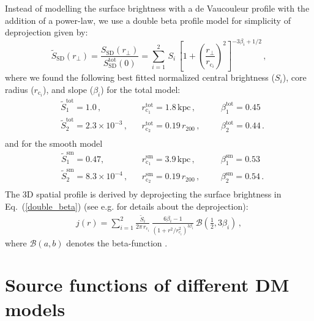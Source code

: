 \documentclass[10pt,aps,pra,reprint,amsmath,amsfonts,amssymb,showpacs,nofootinbib,floatfix]{revtex4-1}
\newcommand{\rmn}{\mathrm}
\newcommand{\sd}{\rmn{SD}}
\newcommand{\rvir}{r_{200}}
\begin{document}
Instead of modelling the surface brightness with a de Vaucouleur
profile with the addition of a power-law, we use a double beta profile
model for simplicity of deprojection given by:
\begin{equation}
\tilde{S}_\sd (r_\bot) = \frac{S_\sd (r_\bot)}{S_\rmn{SD}^\rmn{tot}(0)} = 
\sum_{i=1}^2 \,S_i\, 
\left[1 + \left( \frac{r_\bot}{r_{\mathrm{c}_i}}\right)^2\right]
^{-3\beta_i + 1/2}\,,
\label{double_beta}
\end{equation}
where we found the following best fitted normalized central brightness
($S_i$), core radius ($r_{\mathrm{c}_i}$), and slope ($\beta_i$) for
the total model:
\begin{align}
&\tilde{S}_1^\rmn{tot} = 1.0\,,
&&r_{\mathrm{c}_1}^\rmn{tot} = 1.8\,\rmn{kpc}\,,
&&&\beta_1^\rmn{tot} = 0.45\, \nonumber\\
&\tilde{S}_2^\rmn{tot} = 2.3\times10^{-3}\,,
&&r_{\mathrm{c}_2}^\rmn{tot} = 0.19\,\rvir\,,
&&&\beta_2^\rmn{tot} = 0.44\,.\nonumber\\
& && &&&
\label{fit_spatial_IR}
\end{align}
and for the smooth model
\begin{align}
&\tilde{S}_1^\rmn{sm}=0.47,\,
&&r_{\mathrm{c}_1}^\rmn{sm}=3.9\,\rmn{kpc}\,,
&&&\beta_1^\rmn{sm}=0.53 \,\nonumber\\
&\tilde{S}_2^\rmn{sm}=8.3\times10^{-4}\,,
&&r_{\mathrm{c}_2}^\rmn{sm}=0.19\,\rvir\,,
&&&\beta_2^\rmn{sm}=0.54\,.\nonumber\\
& && &&&
\label{fit_spatial_IR_sm}
\end{align}
The 3D spatial profile is derived by deprojecting the surface
brightness in Eq.~(\ref{double_beta}) (see
e.g. \cite{2004A&A...413...17P} for details about the deprojection):
\begin{eqnarray}
  j(r)  = \sum_{i=1}^2 \frac{\tilde{S}_i}{2\pi\,r_{\mathrm{c}_i}}\,
  \frac{6 \beta_i - 1}{\left(1 + r^2/r^2_{\mathrm{c}_i}\right)^{3\beta_i}}\,
  \mathcal{B}\left(\frac{1}{2},3\beta_i\right)\,,
\end{eqnarray}
where $\mathcal{B}(a,b)$ denotes the beta-function
\cite{1965hmfw.book.....A}.





\section{Source functions of different DM models}
\end{document}
